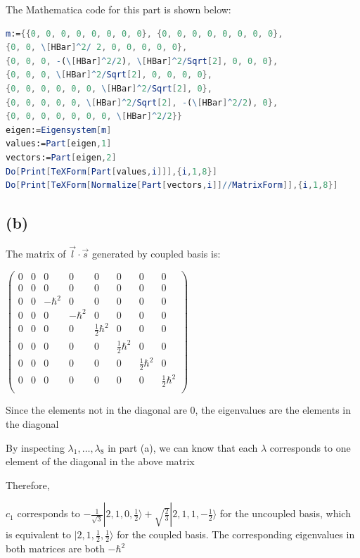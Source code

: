 \documentclass[12pt]{article}
\begin{document}
\begin{spacing}{2.0}

The Mathematica code for this part is shown below:

\begin{lstlisting}[language=Mathematica,breaklines=true,frame=single]
m:={{0, 0, 0, 0, 0, 0, 0, 0}, {0, 0, 0, 0, 0, 0, 0, 0},
{0, 0, \[HBar]^2/ 2, 0, 0, 0, 0, 0},
{0, 0, 0, -(\[HBar]^2/2), \[HBar]^2/Sqrt[2], 0, 0, 0},
{0, 0, 0, \[HBar]^2/Sqrt[2], 0, 0, 0, 0},
{0, 0, 0, 0, 0, 0, \[HBar]^2/Sqrt[2], 0},
{0, 0, 0, 0, 0, \[HBar]^2/Sqrt[2], -(\[HBar]^2/2), 0},
{0, 0, 0, 0, 0, 0, 0, \[HBar]^2/2}}
eigen:=Eigensystem[m]
values:=Part[eigen,1]
vectors:=Part[eigen,2]
Do[Print[TeXForm[Part[values,i]]],{i,1,8}]
Do[Print[TeXForm[Normalize[Part[vectors,i]]//MatrixForm]],{i,1,8}]
\end{lstlisting}

\subsection*{(b)}

The matrix of $\vec{l} \cdot \vec{s}$ generated by coupled basis is:

$\left(
\begin{array}{cccccccc}
 0 & 0 & 0 & 0 & 0 & 0 & 0 & 0 \\
 0 & 0 & 0 & 0 & 0 & 0 & 0 & 0 \\
 0 & 0 & -\hbar ^2 & 0 & 0 & 0 & 0 & 0 \\
 0 & 0 & 0 & -\hbar ^2 & 0 & 0 & 0 & 0 \\
 0 & 0 & 0 & 0 & \frac{1}{2}\hbar ^2 & 0 & 0 & 0 \\
 0 & 0 & 0 & 0 & 0 & \frac{1}{2}\hbar ^2 & 0 & 0 \\
 0 & 0 & 0 & 0 & 0 & 0 & \frac{1}{2}\hbar ^2 & 0 \\
 0 & 0 & 0 & 0 & 0 & 0 & 0 & \frac{1}{2}\hbar ^2 \\
\end{array}
\right)$

Since the elements not in the diagonal are 0, the eigenvalues are the elements in the diagonal

By inspecting $\lambda_1,\ldots,\lambda_8$ in part (a), we can know that each $\lambda$ corresponds to one element of the diagonal in the above matrix

Therefore,

$c_1$ corresponds to $-\frac{1}{\sqrt{3}} |2,1,0,\frac{1}{2} \rangle + \sqrt{\frac{2}{3}}|2,1,1,-\frac{1}{2}\rangle$ for the uncoupled basis, which is equivalent to $|2,1,\frac{1}{2},\frac{1}{2} \rangle$ for the coupled basis. The corresponding eigenvalues in both matrices are both $-\hbar ^2$\\


\end{spacing}
\end{document}
